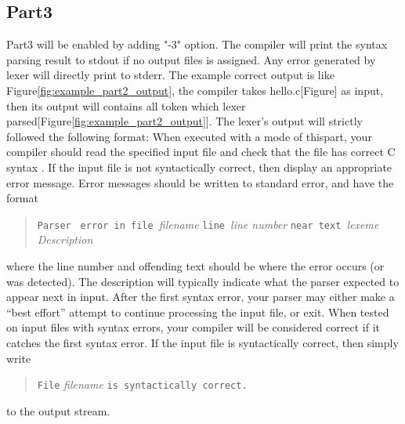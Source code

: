 \documentclass{report}
\newcommand{\+}{}
\begin{document}
    \subsection{Part3}\label{subsec:part3}
    Part3 will be enabled by adding "-3" option. The compiler will print the syntax parsing result to stdout if no output
    files is assigned. Any error generated by lexer will directly print to stderr. The example correct output is like
    Figure\ref{fig:example_part2_output}, the compiler takes hello.c[Figure] as input, then its output will contains all
    token which lexer parsed[Figure\ref{fig:example_part2_output}]. The lexer's output will strictly followed the
    following format:
    When executed with a mode of thispart, your compiler should read the specified input file and check that the file has correct C syntax . If the input file is not syntactically correct, then display an appropriate error message. Error messages should be written to standard error, and have the format
    \begin{quote}
        \begin{tabbing}
        {\tt Parser }
            \={\tt error in file }\emph{filename}
            {\tt line }\emph{line number}
            {\tt near text }\emph{lexeme}
            \\
            \> \emph{Description}
        \end{tabbing}
    \end{quote}
    where the line number and offending text should be where the error occurs (or was detected). The description will typically indicate what the parser expected to appear next in input. After the first syntax error, your parser may either make a ``best effort'' attempt to continue processing the input file, or exit. When tested on input files with syntax errors, your compiler will be considered correct if it catches the first syntax error. If the input file is syntactically correct, then simply write
    \begin{quote}
        \verb|File| \emph{filename} \verb|is syntactically correct.|
    \end{quote}
    to the output stream.
\end{document}
